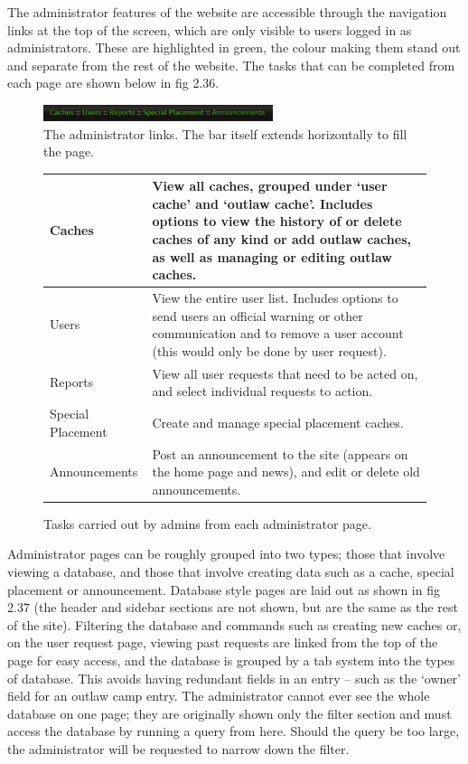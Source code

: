 The administrator features of the website are accessible through the navigation links at the top of the screen, which are only visible to users logged in as administrators. These are highlighted in green, the colour making them stand out and separate from the rest of the website. The tasks that can be completed from each page are shown below in fig 2.36. 
\vspace{55pt}
\begin{figure}[ht]
	\begin{center}
	\includegraphics[width=0.6\textwidth]{images/admin_bar}
	\caption{The administrator links. The bar itself extends horizontally to fill the page.}
	\label{admin_bar}
	\end{center}
\end{figure}
\begin{figure}[ht]
\begin{center}
\begin{tabular}{| p{} | p{} |}
	\hline
	Caches &
	View all caches, grouped under ‘user cache’ and ‘outlaw cache’. Includes options to view the history of or delete caches of any kind or add outlaw caches, as well as managing or editing outlaw caches. \\
	\hline
	Users &
	View the entire user list. Includes options to send users an official warning or other communication and to remove a user account (this would only be done by user request). \\
	\hline
	Reports &
	View all user requests that need to be acted on, and select individual requests to action. \\
	\hline
	Special Placement &
	Create and manage special placement caches. \\
	\hline
	Announcements &
	Post an announcement to the site (appears on the home page and news), and edit or delete old announcements. \\
	\hline
\end{tabular}
\caption {Tasks carried out by admins from each administrator page.}
\label{admin_page_tasks}
\end{center}
\end{figure}


Administrator pages can be roughly grouped into two types; those that involve viewing a database, and those that involve creating data such as a cache, special placement or announcement. Database style pages are laid out as shown in fig 2.37 (the header and sidebar sections are not shown, but are the same as the rest of the site). Filtering the database and commands such as creating new caches or, on the user request page, viewing past requests are linked from the top of the page for easy access, and the database is grouped by a tab system into the types of database. This avoids having redundant fields in an entry – such as the ‘owner’ field for an outlaw camp entry. The administrator cannot ever see the whole database on one page; they are originally shown only the filter section and must access the database by running a query from here. Should the query be too large, the administrator will be requested to narrow down the filter.

